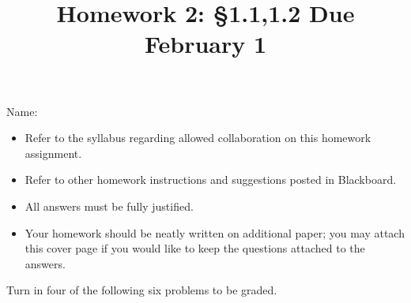 \documentclass[11pt]{amsart}
\begin{document}
\title{Homework 2: \S1.1,1.2 \qquad Due February 1}
\author{}
\date{}
\maketitle
\thispagestyle{empty}

\noindent Name:~\hrulefill~~\\

\begin{itemize}
\item Refer to the syllabus regarding allowed collaboration on this homework assignment.
\item Refer to other homework instructions and suggestions posted in Blackboard.
\item All answers must be fully justified.
\item Your homework should be neatly written on additional paper; you may attach this cover page if you would like to keep the questions attached to the answers.
\end{itemize}

\bigskip

Turn in four of the following six problems to be graded.
\end{document}
